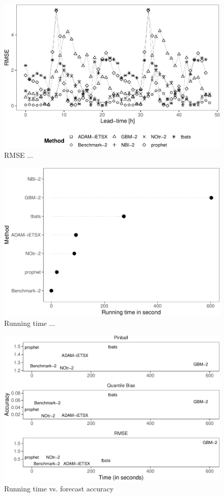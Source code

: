 \documentclass[]{elsarticle} %
\begin{document}
\begin{figure}[H]

{\centering \includegraphics[width=0.7\linewidth]{paper_files/figure-latex/lead-time-rmse-1} 

}

\caption{RMSE ...}\label{fig:lead-time-rmse}
\end{figure}

\begin{figure}[H]

{\centering \includegraphics[width=0.7\linewidth]{paper_files/figure-latex/time-1} 

}

\caption{Running time ...}\label{fig:time}
\end{figure}

\begin{figure}[H]

{\centering \includegraphics[width=0.7\linewidth]{paper_files/figure-latex/time-accuracy-1} 

}

\caption{Running time vs. forecast accuracy}\label{fig:time-accuracy}
\end{figure}
\end{document}
